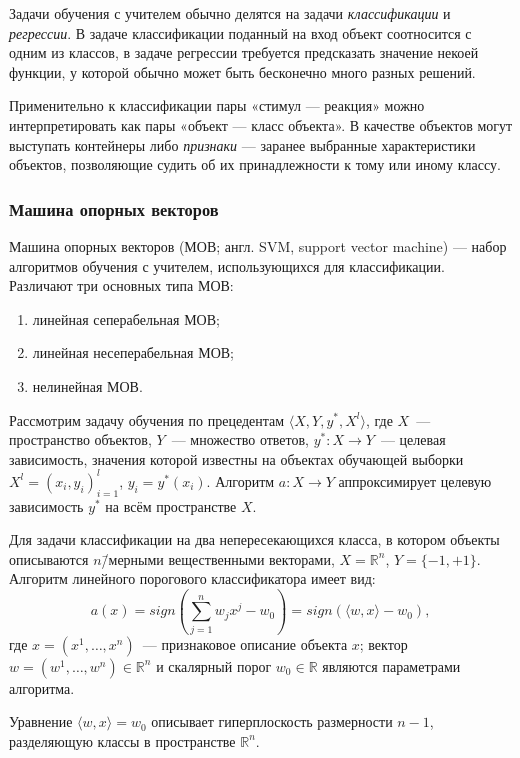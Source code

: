 Задачи обучения с учителем обычно делятся на задачи \textit{классификации} и \textit{регрессии}. В задаче классификации поданный на вход объект соотносится с одним из классов, в задаче регрессии требуется предсказать значение некоей функции, у которой обычно может быть бесконечно много разных решений.

Применительно к классификации пары «стимул --- реакция» можно интерпретировать как пары «объект --- класс объекта». В качестве объектов могут выступать контейнеры либо \textit{признаки} --- заранее выбранные характеристики объектов, позволяющие судить об их принадлежности к тому или иному классу.

\subsubsection{Машина опорных векторов}

Машина опорных векторов (МОВ; англ. SVM, support vector machine) --- набор алгоритмов обучения с учителем, использующихся для классификации. Различают три основных типа МОВ:
\begin{enumerate}
\item линейная сеперабельная МОВ;
\item линейная несеперабельная МОВ;
\item нелинейная МОВ.
\end{enumerate}

Рассмотрим задачу обучения по прецедентам $ \langle X, Y, y^*, X^l \rangle $, где $ X $~--- пространство объектов, $ Y $~--- множество ответов, $ y^*: X \to Y $~--- целевая зависимость, значения которой известны на объектах обучающей выборки $ X^l = (x_i, y_i)_{i = 1}^l $, $ y_i = y^*(x_i) $. Алгоритм $ a: X \to Y $ аппроксимирует целевую зависимость $ y^* $ на всём пространстве $ X $.

Для задачи классификации на два непересекающихся класса, в котором объекты описываются $ n $\=/мерными вещественными векторами, $ X = \mathbb{R}^n $, $ Y = \{-1, +1\} $. Алгоритм линейного порогового классификатора имеет вид:
\begin{equation}
a(x) = sign(\sum_{j = 1}^n w_j x^j - w_0) = sign(\langle w, x \rangle - w_0),
\end{equation}
где $ x = (x^1, \ldots, x^n) $~--- признаковое описание объекта $ x $; вектор $ w = (w^1, \ldots, w^n) \in \mathbb{R}^n $ и скалярный порог $ w_0 \in \mathbb{R} $ являются параметрами алгоритма.

Уравнение $ \langle w, x \rangle = w_0 $ описывает гиперплоскость размерности $ n - 1 $, разделяющую классы в пространстве $ \mathbb{R}^n $.

